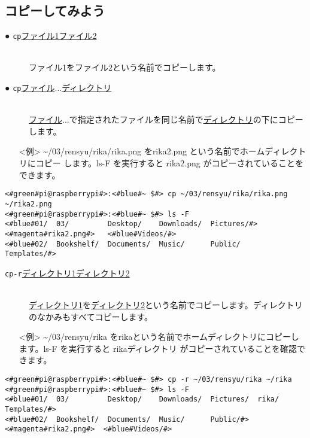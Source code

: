 \subsection{コピーしてみよう}
\begin{description}
    \item[● \texttt{cp}\textvisiblespace \underline{ファイル1}\textvisiblespace \underline{ファイル2}]\mbox{}\\
    ファイル1をファイル2という名前でコピーします。
    \item[● \texttt{cp}\textvisiblespace \underline{ファイル}$\ldots$\textvisiblespace \underline{ディレクトリ}]\mbox{}\\
    \underline{ファイル}$\ldots$で指定されたファイルを同じ名前で\underline{ディレクトリ}の下にコピーします。
\end{description}
\begin{itemize}
\item[<例>]\textasciitilde /03/rensyu/rika/rika.png をrika2.png という名前でホームディレクトリにコピー
します。ls\textvisiblespace -F を実行すると rika2.png がコピーされていることをできます。
\end{itemize}
\begin{lstlisting}[caption=cpの例, label=cp]
<#green#pi@raspberrypi#>:<#blue#~ $#> cp ~/03/rensyu/rika/rika.png ~/rika2.png
<#green#pi@raspberrypi#>:<#blue#~ $#> ls -F
<#blue#01/  03/         Desktop/    Downloads/  Pictures/#>  <#magenta#rika2.png#>   <#blue#Videos/#>
<#blue#02/  Bookshelf/  Documents/  Music/      Public/    Templates/#>
\end{lstlisting}
\begin{description}
\item[\texttt{cp}\textvisiblespace \texttt{-r}\textvisiblespace \underline{ディレクトリ1}\textvisiblespace \underline{ディレクトリ2}]\mbox{}\\
\underline{ディレクトリ1}を\underline{ディレクトリ2}という名前でコピーします。ディレクトリのなかみもすべてコピーします。
\end{description}
\begin{itemize}
\item[<例>]\textasciitilde /03/rensyu/rika をrikaという名前でホームディレクトリにコピーします。ls\textvisiblespace -F を実行すると rikaディレクトリ がコピーされていることを確認できます。
\end{itemize}
\begin{lstlisting}[caption=cp -rの例, label=cp-R]
<#green#pi@raspberrypi#>:<#blue#~ $#> cp -r ~/03/rensyu/rika ~/rika
<#green#pi@raspberrypi#>:<#blue#~ $#> ls -F
<#blue#01/  03/         Desktop/    Downloads/  Pictures/  rika/      Templates/#>
<#blue#02/  Bookshelf/  Documents/  Music/      Public/#>    <#magenta#rika2.png#>  <#blue#Videos/#>
\end{lstlisting}

